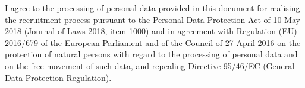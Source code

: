 \documentclass[letterpaper,11pt]{article}
\begin{document}
\vfill
\begin{center}
\tiny
I agree to the processing of personal data provided in this document for realising the recruitment process pursuant to the Personal Data Protection Act of 10 May 2018 (Journal of Laws 2018, item 1000) and in agreement with Regulation (EU) 2016/679 of the European Parliament and of the Council of 27 April 2016 on the protection of natural persons with regard to the processing of personal data and on the free movement of such data, and repealing Directive 95/46/EC (General Data Protection Regulation).
\end{center}

\end{document}
